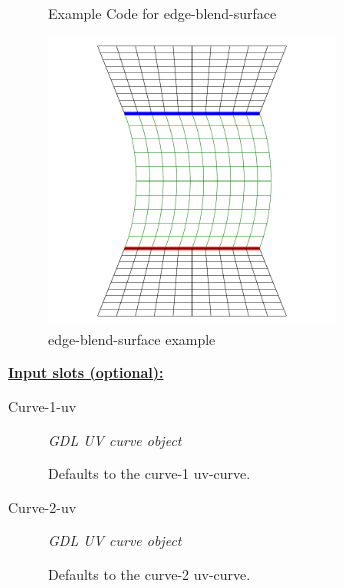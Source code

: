 \documentclass [11pt]{book}
\begin{document}
\begin{itemize}
\begin{figure}
\begin{lrbox}{\boxedverb}
\begin{minipage}{\linewidth}
{\begin{verbatim}
 
\end{verbatim}}
\end{minipage}
\end{lrbox}
\fbox{\usebox{\boxedverb}}

\caption{Example Code for edge-blend-surface}

\label{fig:example-code-edge-blend-surface}

\end{figure}

\begin{figure}
\begin{center}
\includegraphics[width=3in,height=3in]{../images/example-edge-blend-surface.pdf}
\end{center}

\caption{edge-blend-surface example}

\label{fig:edge-blend-surface}

\end{figure}





\textbf{
\underline{Input slots (optional):}}

\begin{description}

\item [Curve-1-uv]
\emph{GDL UV curve object}

 Defaults to the curve-1 uv-curve.




\item [Curve-2-uv]
\emph{GDL UV curve object}

 Defaults to the curve-2 uv-curve.





\end{description}
\end{itemize}
\end{document}
